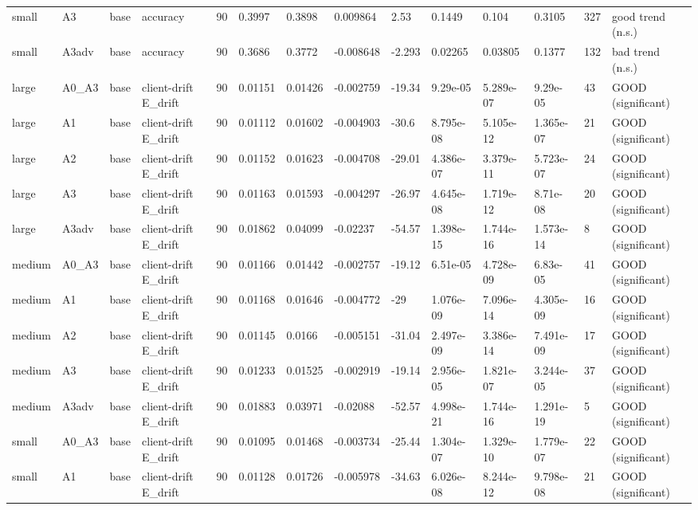 \begin{table}[t]
\begin{tabular}{llllllllllllll}
small & A3 & base & accuracy & 90 & 0.3997 & 0.3898 & 0.009864 & 2.53 & 0.1449 & 0.104 & 0.3105 & 327 & good trend (n.s.) \\
small & A3adv & base & accuracy & 90 & 0.3686 & 0.3772 & -0.008648 & -2.293 & 0.02265 & 0.03805 & 0.1377 & 132 & bad trend (n.s.) \\
large & A0\_A3 & base & client-drift E\_drift & 90 & 0.01151 & 0.01426 & -0.002759 & -19.34 & 9.29e-05 & 5.289e-07 & 9.29e-05 & 43 & GOOD (significant) \\
large & A1 & base & client-drift E\_drift & 90 & 0.01112 & 0.01602 & -0.004903 & -30.6 & 8.795e-08 & 5.105e-12 & 1.365e-07 & 21 & GOOD (significant) \\
large & A2 & base & client-drift E\_drift & 90 & 0.01152 & 0.01623 & -0.004708 & -29.01 & 4.386e-07 & 3.379e-11 & 5.723e-07 & 24 & GOOD (significant) \\
large & A3 & base & client-drift E\_drift & 90 & 0.01163 & 0.01593 & -0.004297 & -26.97 & 4.645e-08 & 1.719e-12 & 8.71e-08 & 20 & GOOD (significant) \\
large & A3adv & base & client-drift E\_drift & 90 & 0.01862 & 0.04099 & -0.02237 & -54.57 & 1.398e-15 & 1.744e-16 & 1.573e-14 & 8 & GOOD (significant) \\
medium & A0\_A3 & base & client-drift E\_drift & 90 & 0.01166 & 0.01442 & -0.002757 & -19.12 & 6.51e-05 & 4.728e-09 & 6.83e-05 & 41 & GOOD (significant) \\
medium & A1 & base & client-drift E\_drift & 90 & 0.01168 & 0.01646 & -0.004772 & -29 & 1.076e-09 & 7.096e-14 & 4.305e-09 & 16 & GOOD (significant) \\
medium & A2 & base & client-drift E\_drift & 90 & 0.01145 & 0.0166 & -0.005151 & -31.04 & 2.497e-09 & 3.386e-14 & 7.491e-09 & 17 & GOOD (significant) \\
medium & A3 & base & client-drift E\_drift & 90 & 0.01233 & 0.01525 & -0.002919 & -19.14 & 2.956e-05 & 1.821e-07 & 3.244e-05 & 37 & GOOD (significant) \\
medium & A3adv & base & client-drift E\_drift & 90 & 0.01883 & 0.03971 & -0.02088 & -52.57 & 4.998e-21 & 1.744e-16 & 1.291e-19 & 5 & GOOD (significant) \\
small & A0\_A3 & base & client-drift E\_drift & 90 & 0.01095 & 0.01468 & -0.003734 & -25.44 & 1.304e-07 & 1.329e-10 & 1.779e-07 & 22 & GOOD (significant) \\
small & A1 & base & client-drift E\_drift & 90 & 0.01128 & 0.01726 & -0.005978 & -34.63 & 6.026e-08 & 8.244e-12 & 9.798e-08 & 21 & GOOD (significant) \\

\end{tabular}
\end{table}
